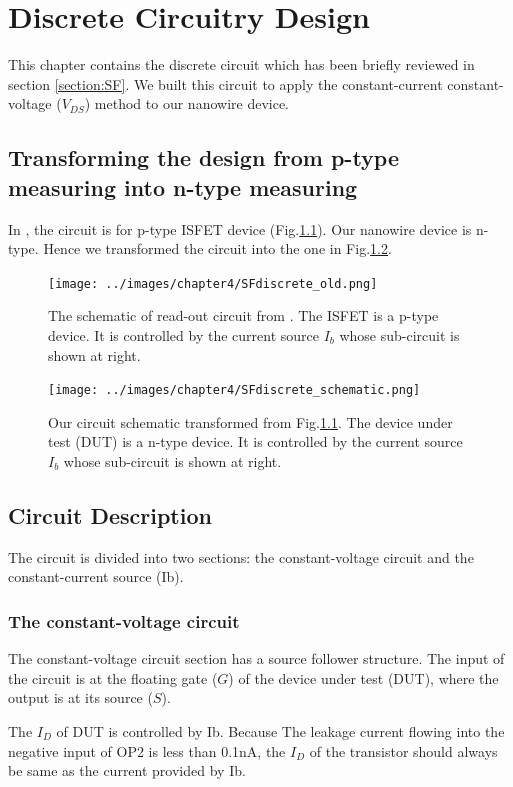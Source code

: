 \chapter{Discrete Circuitry Design}
This chapter contains the discrete circuit which has been briefly reviewed in section \ref{section:SF}.
We built this circuit to apply the constant-current constant-voltage ($V_{DS}$) method to our nanowire device.

\section{Transforming the design from p-type measuring into n-type measuring}
In \cite{SF1}, the circuit is for p-type ISFET device (Fig.\ref{fig:SF_schematic_old}).
Our nanowire device is n-type.
Hence we transformed the circuit into the one in Fig.\ref{fig:SF_schematic}.
\begin{figure}[!htbp]
    \centering
    \texttt{[image: ../images/chapter4/SFdiscrete\_old.png]}
    \caption{The schematic of read-out circuit from \cite{SF1}. The ISFET is a p-type device. It is controlled by the current source $I_b$ whose sub-circuit is shown at right.}
    \label{fig:SF_schematic_old}
\end{figure}
\begin{figure}[!htbp]
    \centering
    \texttt{[image: ../images/chapter4/SFdiscrete\_schematic.png]}
    \caption{Our circuit schematic transformed from Fig.\ref{fig:SF_schematic_old}. The device under test (DUT) is a n-type device. It is controlled by the current source $I_b$ whose sub-circuit is shown at right.}
    \label{fig:SF_schematic}
\end{figure}


\section{Circuit Description}
The circuit is divided into two sections: the constant-voltage circuit and the constant-current source (Ib).

\subsection*{The constant-voltage circuit}
The constant-voltage circuit section has a source follower structure.
The input of the circuit is at the floating gate ($G$) of the device under test (DUT), where the output is at its source ($S$).

The $I_D$ of DUT is controlled by Ib.
Because The leakage current flowing into the negative input of OP2 is less than 0.1nA, the $I_D$ of the transistor should always be same as the current provided by Ib.

